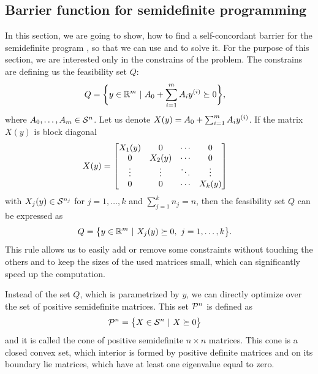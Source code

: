 \subsection{Barrier function for semidefinite programming}
In this section, we are going to show, how to find a self-concordant barrier for the semidefinite program , so that we can use  and  to solve it.
For the purpose of this section, we are interested only in the constrains of the problem.
The constrains are defining us the feasibility set $Q$:
\begin{align}
  Q &= \bigg\{y\in\mathbb{R}^m\ |\ A_0 + \sum_{i=1}^mA_iy^{(i)} \succeq 0\bigg\},
\end{align}
where $A_0, \ldots, A_m \in\mathcal{S}^n$.
Let us denote $X(y) = A_0 + \sum_{i=1}^mA_iy^{(i)}$.
If the matrix $X(y)$ is block diagonal
\begin{align}
  X(y) &= \begin{bmatrix}
          X_1(y) & 0      & \cdots & 0      \\
          0      & X_2(y) & \cdots & 0      \\
          \vdots & \vdots & \ddots & \vdots \\
          0      & 0      & \cdots & X_k(y)
        \end{bmatrix} \labeleq{SDP:bf:bd}
\end{align}
with $X_j(y)\in\mathcal{S}^{n_j}$ for $j = 1, \ldots, k$ and $\sum_{j=1}^k n_j = n$, then the feasibility set $Q$ can be expressed as
\begin{align}
  Q &= \big\{y\in\mathbb{R}^m\ |\ X_j(y) \succeq 0,\ j = 1,\ldots, k\big\}.
\end{align}
This rule allows us to easily add or remove some constraints without touching the others and to keep the sizes of the used matrices small, which can significantly speed up the computation.

Instead of the set $Q$, which is parametrized by $y$, we can directly optimize over the set of positive semidefinite matrices. This set $\mathcal{P}^n$ is defined as
\begin{align}
  \mathcal{P}^n &= \big\{X\in\mathcal{S}^n\ |\ X\succeq0\big\}
\end{align}
and it is called the cone of positive semidefinite $n\times n$ matrices. This cone is a closed convex set, which interior is formed by positive definite matrices and on its boundary lie matrices, which have at least one eigenvalue equal to zero.

